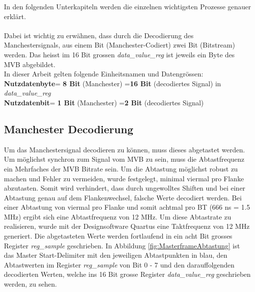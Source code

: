 In den folgenden Unterkapiteln werden die einzelnen wichtigsten Prozesse genauer erklärt.\\
\\
Dabei ist wichtig zu erwähnen, dass durch die Decodierung des Manchestersignals, aus einem Bit
(Manchester-Codiert) zwei Bit (Bitstream) werden. Das heisst im 16 Bit grossen 
\textit{data\_value\_reg} ist jeweils ein Byte des MVB abgebildet.\\
\newline
In dieser Arbeit gelten folgende Einheitsnamen und Datengrössen:\\
\textbf{Nutzdatenbyte}\hspace{0.1cm}= \textbf{8 Bit} (Manchester) =\hspace{0.1cm}\textbf{16 Bit} (decodiertes Signal) in \textit{data\_value\_reg}\\
\textbf{Nutzdatenbit}\hspace{0.37cm}= \textbf{1 Bit} (Manchester) =\hspace{0.3cm}\textbf{2  Bit} (decodiertes Signal)
\newpage
\subsection{Manchester Decodierung}
\label{Manchester Decodierung}

Um das Manchestersignal decodieren zu können, muss dieses abgetastet werden. Um möglichst synchron zum
Signal vom MVB zu sein, muss die Abtastfrequenz ein Mehrfaches der MVB Bitrate sein. Um die Abtastung möglichst
robust zu machen und Fehler zu vermeiden, wurde festgelegt, minimal viermal pro Flanke abzutasten. Somit
wird verhindert, dass durch ungewolltes Shiften und bei einer Abtastung genau auf dem Flankenwechsel, falsche Werte
decodiert werden.
Bei einer Abtastung von viermal pro Flanke und somit achtmal pro BT (666 ns = 1.5 MHz) ergibt sich eine Abtastfrequenz von 12 MHz.
Um diese Abtastrate zu realisieren, wurde mit der Designsoftware Quartus eine Taktfrequenz von 12 MHz generiert.
Die abgetasteten Werte werden fortlaufend in ein acht Bit grosses Register \textit{reg\_sample} geschrieben.
In Abbildung \ref{fig:MasterframeAbtastung} ist das Master Start-Delimiter mit den
jeweiligen Abtastpunkten in blau, den Abtastwerten im Register \textit{reg\_sample} von Bit 0 - 7 und den darauffolgenden decodierten 
Werten, welche ins 16 Bit grosse Register \textit{data\_value\_reg} geschrieben werden, zu sehen.


